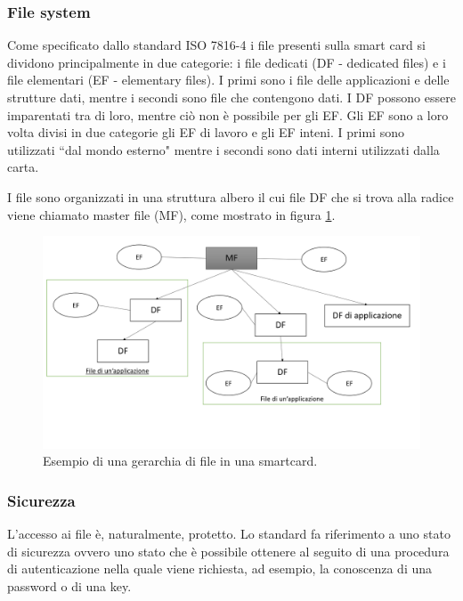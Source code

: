 \subsubsection{File system}
Come specificato dallo standard ISO 7816-4 i file presenti sulla smart card si dividono principalmente in due categorie: i file dedicati (DF - dedicated files) e i file elementari (EF - elementary files). I primi sono i file delle applicazioni e delle strutture dati, mentre i secondi sono file che contengono dati. I DF possono essere imparentati tra di loro, mentre ciò non è possibile per gli EF. Gli EF sono a loro volta divisi in due categorie gli EF di lavoro e gli EF inteni. I primi sono utilizzati ``dal mondo esterno" mentre i secondi sono dati interni utilizzati dalla carta.

I file sono organizzati in una struttura albero il cui file DF che si trova alla radice viene chiamato master file (MF), come mostrato in figura \ref{fig:file_system}.

\begin{figure}[h!]
  \centering
  \includegraphics[width=400pt]{pictures/gerarchia_file.png}
  \caption{Esempio di una gerarchia di file in una smartcard.}
  \label{fig:file_system}
\end{figure}

\subsubsection{Sicurezza}
L'accesso ai file è, naturalmente, protetto. Lo standard fa riferimento a uno stato di sicurezza ovvero uno stato che è possibile ottenere al seguito di una procedura di autenticazione nella quale viene richiesta, ad esempio, la conoscenza di una password o di una key.

